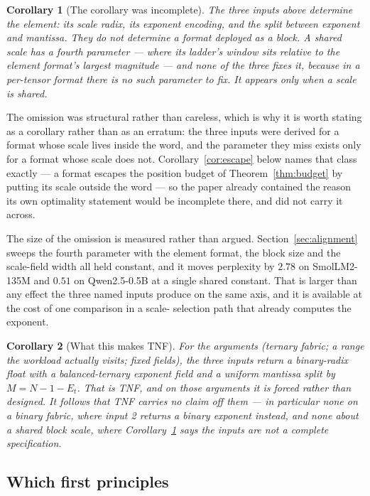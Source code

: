\documentclass[11pt]{article}
\newtheorem{corollary}{Corollary}
\theoremstyle{definition}
\begin{document}
\begin{corollary}[The corollary was incomplete]
\label{cor:determined}
The three inputs above determine the \emph{element}: its scale radix, its
exponent encoding, and the split between exponent and mantissa. They do not
determine a format deployed as a block. A shared scale has a fourth parameter ---
where its ladder's window sits relative to the element format's largest
magnitude --- and none of the three fixes it, because in a per-tensor format
there is no such parameter to fix. It appears only when a scale is shared.
\end{corollary}

The omission was structural rather than careless, which is why it is worth
stating as a corollary rather than as an erratum: the three inputs were derived
for a format whose scale lives inside the word, and the parameter they miss
exists only for a format whose scale does not. Corollary~\ref{cor:escape} below
names that class exactly --- a format escapes the position budget of
Theorem~\ref{thm:budget} by putting its scale outside the word --- so the paper
already contained the reason its own optimality statement would be incomplete
there, and did not carry it across.

The size of the omission is measured rather than argued.
Section~\ref{sec:alignment} sweeps the fourth parameter with the element format,
the block size and the scale-field width all held constant, and it moves
perplexity by $2.78$ on SmolLM2-135M and $0.51$ on Qwen2.5-0.5B at a single
shared constant. That is larger than any effect the three named inputs produce on
the same axis, and it is available at the cost of one comparison in a scale-
selection path that already computes the exponent.

\begin{corollary}[What this makes TNF]
\label{cor:whatitmakes}
For the arguments (ternary fabric; a range the workload actually visits; fixed
fields), the three inputs return a binary-radix float with a balanced-ternary
exponent field and a uniform mantissa split by $M = N - 1 - E_t$. That is TNF,
and on those arguments it is forced rather than designed. It follows that TNF
carries no claim off them --- in particular none on a binary fabric, where input
2 returns a binary exponent instead, and none about a shared block scale, where
Corollary~\ref{cor:determined} says the inputs are not a complete specification.
\end{corollary}

\subsection{Which first principles}
\label{sec:principles}
\end{document}

